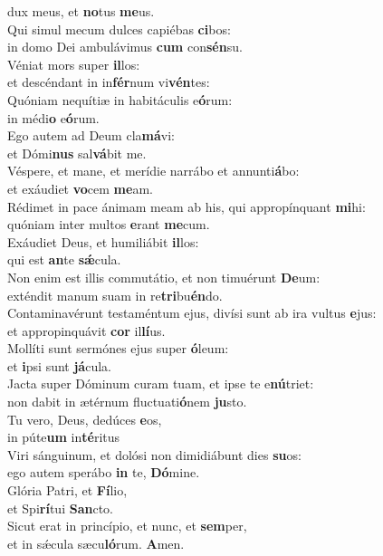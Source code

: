 \evenverse dux meus, et \textbf{no}tus \textbf{me}us.\\
\oddverse Qui simul mecum dulces capiébas \textbf{ci}bos:~\*\\
\oddverse in domo Dei ambulávimus \textbf{cum} con\textbf{sén}su.\\
\evenverse Véniat mors super \textbf{il}los:~\*\\
\evenverse et descéndant in in\textbf{fér}num vi\textbf{vén}tes:\\
\oddverse Quóniam nequítiæ in habitáculis e\textbf{ó}rum:~\*\\
\oddverse in médi\textbf{o} e\textbf{ó}rum.\\
\evenverse Ego autem ad Deum cla\textbf{má}vi:~\*\\
\evenverse et Dómi\textbf{nus} sal\textbf{vá}bit me.\\
\oddverse Véspere, et mane, et merídie narrábo et annunti\textbf{á}bo:~\*\\
\oddverse et exáudiet \textbf{vo}cem \textbf{me}am.\\
\evenverse Rédimet in pace ánimam meam ab his, qui appropínquant \textbf{mi}hi:~\*\\
\evenverse quóniam inter multos \textbf{e}rant \textbf{me}cum.\\
\oddverse Exáudiet Deus, et humiliábit \textbf{il}los:~\*\\
\oddverse qui est \textbf{an}te \textbf{sǽ}cula.\\
\evenverse Non enim est illis commutátio, et non timuérunt \textbf{De}um:~\*\\
\evenverse exténdit manum suam in re\textbf{tri}bu\textbf{én}do.\\
\oddverse Contaminavérunt testaméntum ejus, divísi sunt ab ira vultus \textbf{e}jus:~\*\\
\oddverse et appropinquávit \textbf{cor} il\textbf{lí}us.\\
\evenverse Mollíti sunt sermónes ejus super \textbf{ó}leum:~\*\\
\evenverse et \textbf{i}psi sunt \textbf{já}cula.\\
\oddverse Jacta super Dóminum curam tuam, et ipse te e\textbf{nú}triet:~\*\\
\oddverse non dabit in ætérnum fluctuati\textbf{ó}nem \textbf{ju}sto.\\
\evenverse Tu vero, Deus, dedúces \textbf{e}os,~\*\\
\evenverse in púte\textbf{um} in\textbf{té}ritus\\
\oddverse Viri sánguinum, et dolósi non dimidiábunt dies \textbf{su}os:~\*\\
\oddverse ego autem sperábo \textbf{in} te, \textbf{Dó}mine.\\
\evenverse Glória Patri, et \textbf{Fí}lio,~\*\\
\evenverse et Spi\textbf{rí}tui \textbf{San}cto.\\
\oddverse Sicut erat in princípio, et nunc, et \textbf{sem}per,~\*\\
\oddverse et in sǽcula sæcu\textbf{ló}rum. \textbf{A}men.\\
